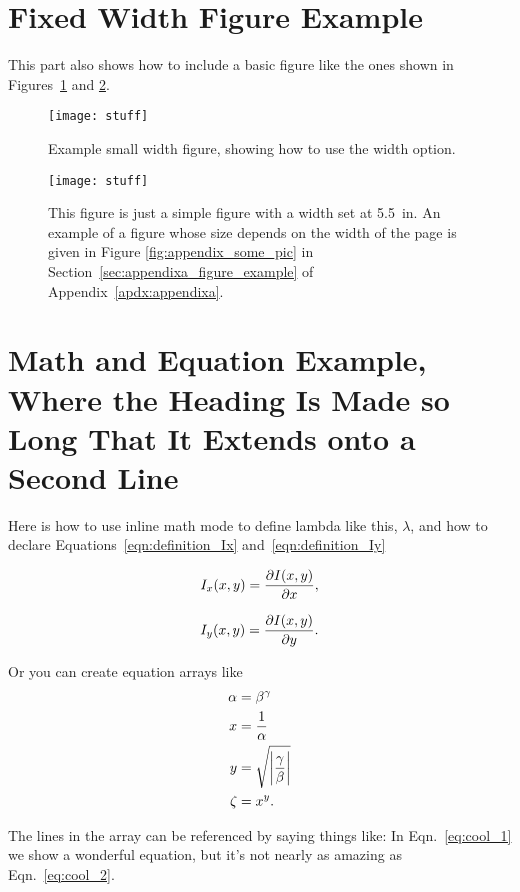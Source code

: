 \section{Fixed Width Figure Example} \label{sec:intro_figure_example}
This part also shows how to include a basic figure like the ones
shown in Figures~\ref{fig:intro_stuff2} and \ref{fig:intro_stuff}. %
\begin{figure}[t]
  \centering
  \texttt{[image: stuff]}
  \caption[Example small width figure]{
Example small width figure, showing how to use the width option.}
%
  \label{fig:intro_stuff2}
\end{figure}

\begin{figure}[t]
  \centering
  \texttt{[image: stuff]}
  \caption[Example fixed width figure]{
This figure is just a simple figure with a width set at 5.5~in. An example of a
figure whose size depends on the width of the page is given in
Figure \ref{fig:appendix_some_pic} in Section~\ref{sec:appendixa_figure_example} of Appendix~\ref{apdx:appendixa}.}
%
  \label{fig:intro_stuff}
\end{figure}


\section{Math and Equation Example, Where the Heading Is Made so Long That It Extends onto a Second Line}
Here is how to use inline math mode to define lambda like this,
$\lambda$, and how to declare Equations~\eqref{eqn:definition_Ix}
and~\eqref{eqn:definition_Iy}

\begin{equation} \label{eqn:definition_Ix}
I_x(x,y) = \frac{\partial I(x,y)}{\partial x},
\end{equation}

\begin{equation}\label{eqn:definition_Iy}
I_y(x,y) = \frac{\partial I(x,y)}{\partial y}.
\end{equation}

 Or you can create equation arrays like
\begin{align}
  \alpha &= \beta^\gamma \\
  x &= \frac{1}{\alpha} \label{eq:cool_1} \\
  y &= \sqrt{\left|\frac{\gamma}{\beta}\right|}  \\
  \zeta &= x^y \label{eq:cool_2}.
\end{align}


The lines in the array can be referenced by saying things like: In
Eqn.~\eqref{eq:cool_1} we show a wonderful equation, but it's not nearly as
amazing as Eqn.~\eqref{eq:cool_2}.
